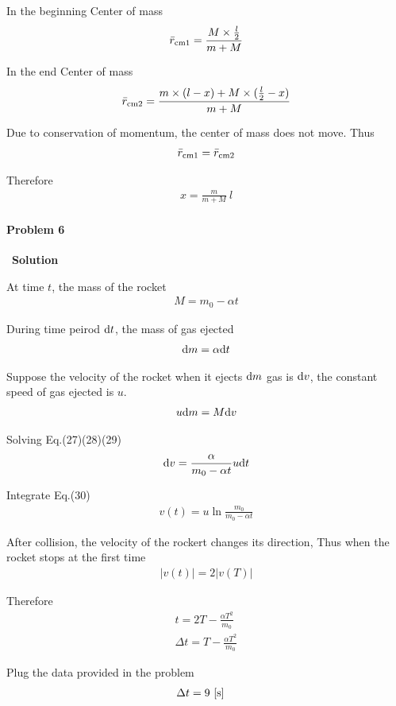 \documentclass[12pt,a4paper]{article}
\begin{document}
In the beginning
Center of mass
\begin{align}
    \bar{r}_{\rm cm1} = \frac{M\times \frac{l}{2}}{m+M}
\end{align}

In the end
Center of mass
\begin{align}
    \bar{r}_{\rm cm2} = \frac{m\times (l-x) + M\times (\frac{l}{2}-x)}{m+M}
\end{align}

Due to conservation of momentum, the center of mass does not move. Thus
\begin{align}
    \bar{r}_{\rm cm1} = \bar{r}_{\rm cm2}
\end{align}

Therefore
\begin{align}
    x = \frac{m}{m+M}\ l
\end{align}

\paragraph{\large \textbf{Problem 6}}~{\textbf{Solution}}
\vspace{2mm}

At time $t$, the mass of the rocket
\begin{align}
    M = m_0 - \alpha t
\end{align}

During time peirod ${\rm d}t$, the mass of gas ejected
\begin{align}
    {\rm d}m = \alpha {\rm d}t
\end{align}

Suppose the velocity of the rocket when it ejects ${\rm d}m$ gas is ${\rm d}v$, the 
constant speed of gas ejected is $u$.
\begin{align}
    u{\rm d}m = M{\rm d}v
\end{align}

Solving Eq.(27)(28)(29)
\begin{align}
    {\rm d}v = \frac{\alpha}{m_0 - \alpha t}u {\rm d}t
\end{align}

Integrate Eq.(30)
\begin{align}
    v(t) = u\ln\frac{m_0}{m_0 - \alpha t}
\end{align}

After collision, the velocity of the rockert changes its direction, Thus when the rocket stops
at the first time
\begin{align}
    |v(t)| = 2|v(T)|
\end{align}

Therefore
\begin{align}
    t = 2T - \frac{\alpha T^2}{m_0}\\
    \Delta t = T - \frac{\alpha T^2}{m_0}
\end{align}

Plug the data provided in the problem
\begin{align}
    \Delta t &= 9\ {[\rm s]}
\end{align}
\end{document}

